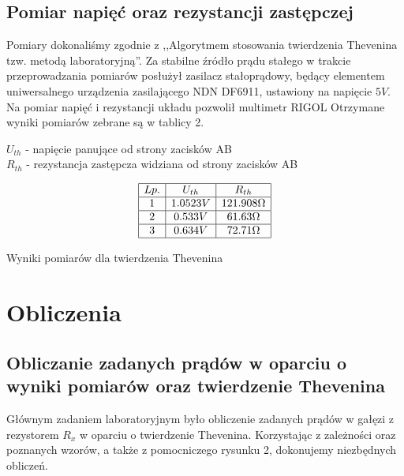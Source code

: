 \documentclass[polish,a4paper]{article}
\begin{document}
\subsection{Pomiar napięć oraz rezystancji zastępczej}
Pomiary dokonaliśmy zgodnie z ,,Algorytmem stosowania twierdzenia Thevenina tzw. metodą laboratoryjną''.\cite{naum} Za stabilne źródło prądu stałego w trakcie przeprowadzania pomiarów posłużył zasilacz  stałoprądowy, będący elementem uniwersalnego urządzenia zasilającego NDN DF6911, ustawiony na napięcie $5V$. Na pomiar napięć i rezystancji układu pozwolił multimetr RIGOL Otrzymane wyniki pomiarów zebrane są w tablicy 2.
\begin{center}
$U_{th}$ - napięcie\hspace{0.15cm} panujące\hspace{0.15cm} od\hspace{0.15cm} strony\hspace{0.15cm} zacisków\hspace{0.15cm} AB\\
$R_{th}$ - rezystancja\hspace{0.15cm} zastępcza\hspace{0.15cm} widziana\hspace{0.15cm} od\hspace{0.15cm} strony\hspace{0.15cm} zacisków\hspace{0.15cm} AB
\end{center}

\begin{table}[H]
\centering
$$
\begin{array}{|c|c|c|}
\hline
 Lp.& U_{th} & R_{th}\\
\hline 
1 & 1.0523V & 121.908\Omega\\
\hline
 2&0.533V & 61.63\Omega\\
\hline
3 & 0.634V & 72.71\Omega\\
\hline
\end{array}
$$
\caption{Wyniki pomiarów dla twierdzenia Thevenina}
\end{table}
\pagebreak
\section{Obliczenia}
\subsection{Obliczanie zadanych prądów w oparciu o wyniki pomiarów oraz twierdzenie Thevenina} 
Głównym zadaniem laboratoryjnym było obliczenie zadanych prądów w gałęzi z rezystorem $R_x$ w oparciu o twierdzenie Thevenina. Korzystając z zależności oraz poznanych wzorów\cite{naum}, a także z pomocniczego rysunku 2, dokonujemy niezbędnych obliczeń.
\end{document}
